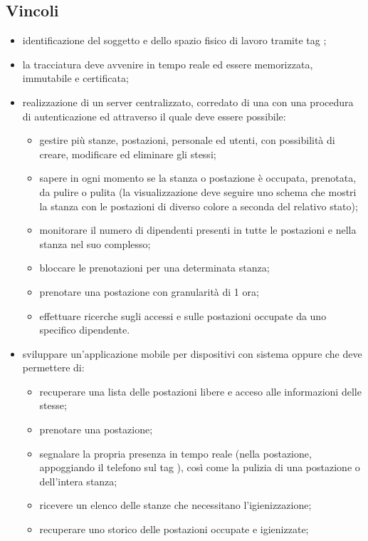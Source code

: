 \subsection{Vincoli}
\begin{itemize}
\item identificazione del soggetto e dello spazio fisico di lavoro tramite tag ;
\item la tracciatura deve avvenire in tempo reale ed essere memorizzata, immutabile e certificata;
\item realizzazione di un server centralizzato, corredato di una  con una procedura di autenticazione ed attraverso il quale deve essere possibile:
\begin{itemize}
\item gestire più stanze, postazioni, personale ed utenti, con possibilità di creare, modificare ed eliminare gli stessi;
\item sapere in ogni momento se la stanza o postazione è occupata, prenotata, da pulire o pulita (la visualizzazione deve seguire uno schema che mostri la stanza con le postazioni di diverso colore a seconda del relativo stato);
\item monitorare il numero di dipendenti presenti in tutte le postazioni e nella stanza nel suo complesso;
\item bloccare le prenotazioni per una determinata stanza;
\item prenotare una postazione con granularità di 1 ora;
\item effettuare ricerche sugli accessi e sulle postazioni occupate da uno specifico dipendente.
\end{itemize}
\item sviluppare un'applicazione mobile per dispositivi con sistema  oppure  che deve permettere di:
\begin{itemize}
\item recuperare una lista delle postazioni libere e acceso alle informazioni delle stesse;
\item prenotare una postazione;
\item segnalare la propria presenza in tempo reale (nella postazione, appoggiando il telefono sul tag ), così come la pulizia di una postazione o dell'intera stanza;
\item ricevere  un  elenco  delle  stanze  che  necessitano l’igienizzazione;
\item recuperare uno storico delle postazioni occupate e igienizzate;
\end{itemize}

\end{itemize}
